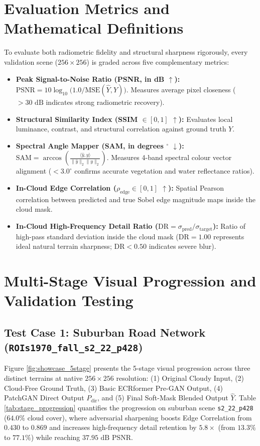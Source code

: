 \documentclass[12pt,a4paper]{report}
\begin{document}
\section{Evaluation Metrics and Mathematical Definitions}
To evaluate both radiometric fidelity and structural sharpness rigorously, every validation scene ($256\times 256$) is graded across five complementary metrics:
\begin{itemize}
    \item \textbf{Peak Signal-to-Noise Ratio (PSNR, in dB $\uparrow$):} $\text{PSNR} = 10\log_{10}\!\big(1.0 / \text{MSE}(\hat{Y}, Y)\big)$. Measures average pixel closeness ($>30\text{ dB}$ indicates strong radiometric recovery).
    \item \textbf{Structural Similarity Index (SSIM $\in [0,1]$ $\uparrow$):} Evaluates local luminance, contrast, and structural correlation against ground truth $Y$.
    \item \textbf{Spectral Angle Mapper (SAM, in degrees $^{\circ}$ $\downarrow$):} $\text{SAM} = \arccos\!\left(\frac{\langle \hat{y}, y \rangle}{\|\hat{y}\|_2 \|y\|_2}\right)$. Measures 4-band spectral colour vector alignment ($<3.0^{\circ}$ confirms accurate vegetation and water reflectance ratios).
    \item \textbf{In-Cloud Edge Correlation ($\rho_{\text{edge}} \in [0,1]$ $\uparrow$):} Spatial Pearson correlation between predicted and true Sobel edge magnitude maps inside the cloud mask.
    \item \textbf{In-Cloud High-Frequency Detail Ratio ($\text{DR} = \sigma_{\text{pred}} / \sigma_{\text{target}}$):} Ratio of high-pass standard deviation inside the cloud mask ($\text{DR} = 1.00$ represents ideal natural terrain sharpness; $\text{DR} < 0.50$ indicates severe blur).
\end{itemize}

\section{Multi-Stage Visual Progression and Validation Testing}
\subsection{Test Case 1: Suburban Road Network (\texttt{ROIs1970\_fall\_s2\_22\_p428})}
Figure \ref{fig:showcase_5stage} presents the 5-stage visual progression across three distinct terrains at native $256\times 256$ resolution: (1) Original Cloudy Input, (2) Cloud-Free Ground Truth, (3) Basic ECRformer Pre-GAN Output, (4) PatchGAN Direct Output $P_{\text{dir}}$, and (5) Final Soft-Mask Blended Output $\hat{Y}$. Table \ref{tab:stage_progression} quantifies the progression on suburban scene \texttt{s2\_22\_p428} ($64.0\%$ cloud cover), where adversarial sharpening boosts Edge Correlation from $0.430$ to $0.869$ and increases high-frequency detail retention by $5.8\times$ (from $13.3\%$ to $77.1\%$) while reaching $37.95\text{ dB}$ PSNR.
\end{document}
